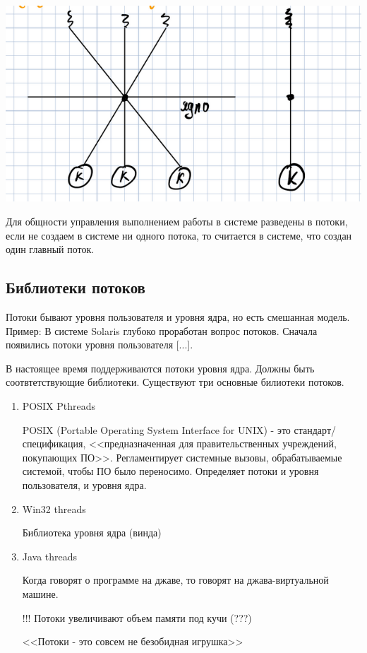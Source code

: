 \documentclass[14pt, a4paper]{article}
\begin{document}
	\includegraphics[width=\linewidth]{2}
	
	Для общности управления выполнением работы в системе разведены в потоки, если не создаем в системе ни одного потока, то считается в системе, что создан один главный поток.
	
	\subsection*{Библиотеки потоков}
	
	Потоки бывают уровня пользователя и уровня ядра, но есть смешанная модель. Пример: В системе Solaris глубоко проработан вопрос потоков. Сначала появились потоки уровня пользователя [...].
	
	В настоящее время поддерживаются потоки уровня ядра. Должны быть соотвтетствующие библиотеки. Существуют три основные билиотеки потоков.
	
	\begin{enumerate}
		\item POSIX Pthreads
		
		POSIX (Portable Operating System Interface for UNIX) - это стандарт/спецификация, <<предназначенная для правительственных учреждений, покупающих ПО>>. Регламентирует системные вызовы, обрабатываемые системой, чтобы ПО было переносимо. Определяет потоки и уровня пользователя, и уровня ядра.
		
		\item Win32 threads
		
		Библиотека уровня ядра (винда)
		
		\item Java threads
		
		Когда говорят о программе на джаве, то говорят на джава-виртуальной машине.
		
		!!! Потоки увеличивают объем памяти под кучи (???)
		
		<<Потоки - это совсем не безобидная игрушка>>
	\end{enumerate}
\end{document}
